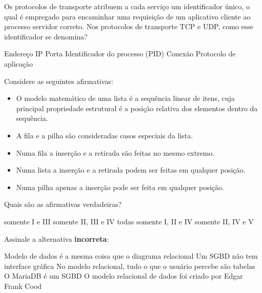 \documentclass[12pt, addpoints]{exam}
\begin{document}
\begin{questions}
\question

Os protocolos de transporte atribuem a cada serviço um identificador único, o qual é empregado para encaminhar uma requisição de um aplicativo cliente ao processo servidor correto. Nos protocolos de transporte TCP e UDP, como esse identificador se denomina?
\begin{choices}
\choice Endereço IP
\choice Porta
\choice Identificador do processo (PID)
\choice Conexão
\choice Protocolo de aplicação
\end{choices}

\question

Considere as seguintes afirmativas:

\begin{itemize}

    \item O modelo matemático de uma lista é a sequência linear de itens, cuja principal propriedade estrutural é a posição relativa dos elementos dentro da sequência.

    \item A fila e a pilha são consideradas casos especiais da lista.

    \item Numa fila a inserção e a retirada são feitas no mesmo extremo.

    \item Numa lista a inserção e a retirada podem ser feitas em qualquer posição.

    \item Numa pilha apenas a inserção pode ser feita em qualquer posição.

\end{itemize}



Quais são as afirmativas verdadeiras?
\begin{choices}
\choice somente I e III
\choice somente II, III e IV
\choice todas
\choice somente I, II e IV
\choice somente II, IV e V
\end{choices}

\question Assinale a alternativa \textbf{incorreta}:
\begin{choices}
\choice Modelo de dados é a mesma coisa que o diagrama relacional
\choice Um SGBD não tem interface gráfica
\choice No modelo relacional, tudo o que o usuário percebe são tabelas
\choice O MariaDB é um SGBD
\choice O modelo relacional de dados foi criado por Edgar Frank Cood
\end{choices}


\end{questions}
\end{document}

